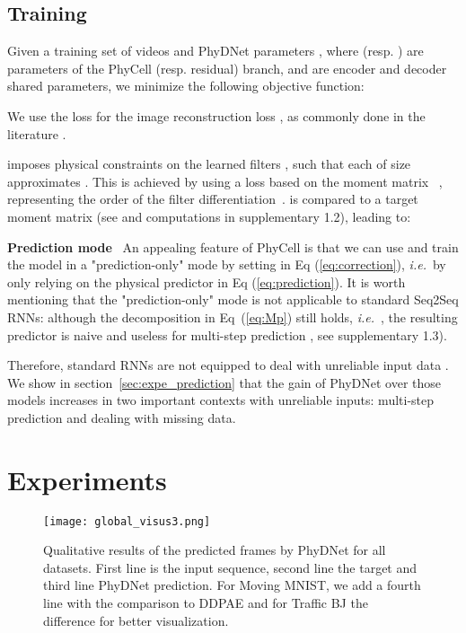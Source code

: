 \documentclass[10pt,twocolumn,letterpaper]{article}
\def\ie{\textit{i.e.}~}
\begin{document}
\subsection{Training}
\label{sec:training}

Given a training set of  videos  and PhyDNet parameters , where  (resp.  ) are parameters of the PhyCell (resp. residual) branch,  and  are encoder and decoder shared parameters, we minimize the following objective function:

We use the  loss for the image reconstruction loss , as commonly done in the literature \cite{wang2017predrnn,wang2018predrnn++,oliu2018folded,wang2018eidetic,wang2019memory}. 

 imposes physical constraints on the  learned filters  , such that each  of size  approximates . This is achieved by using a loss based on the moment matrix ~\cite{long2019pde}, representing the order of the filter differentiation~\cite{dong2017image}.   is compared to a target moment matrix  (see  and  computations in supplementary 1.2), leading to: 
 

\textbf{Prediction mode} 
~An appealing feature of PhyCell is that we can use and train the model in a "prediction-only" mode by setting  in Eq (\ref{eq:correction}), \ie by only relying on the physical predictor  in Eq (\ref{eq:prediction}). It is worth mentioning that the "prediction-only" mode is not applicable to standard Seq2Seq RNNs: although the decomposition in Eq~(\ref{eq:Mp}) still holds, \ie , the resulting predictor is naive and useless for multi-step prediction  , see supplementary 1.3). 


Therefore, standard RNNs are not equipped to deal with unreliable input data . We show in section~\ref{sec:expe_prediction} that the gain of PhyDNet over those models increases in two important contexts with unreliable inputs: multi-step prediction and dealing with missing data.

\section{Experiments}
\label{section4}

\begin{figure*}[ht]
    \centering
    \texttt{[image: global\_visus3.png]}
    \caption{Qualitative results of the predicted frames by PhyDNet for all datasets. First line is the input sequence, second line the target and third line PhyDNet prediction. For Moving MNIST, we add a fourth line with the comparison to DDPAE \cite{hsieh2018learning} and for Traffic BJ the difference  for better visualization.}
    \label{fig:visus}
\end{figure*}
\end{document}
